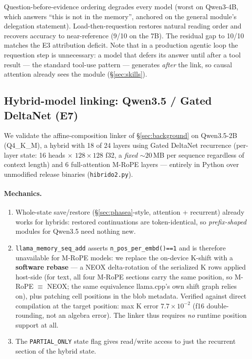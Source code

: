 \documentclass[11pt]{article}
\newcommand{\code}[1]{\texttt{#1}}
\begin{document}
Question-before-evidence ordering degrades every model (worst on Qwen3-4B, which answers ``this is not in the memory'', anchored on the general module's delegation statement). Load-then-requestion restores natural reading order and recovers accuracy to near-reference (9/10 on the 7B). The residual gap to 10/10 matches the E3 attribution deficit. Note that in a production agentic loop the requestion step is unnecessary: a model that defers its answer until after a tool result --- the standard tool-use pattern --- generates \emph{after} the link, so causal attention already sees the module (\S\ref{sec:skills}).

\subsection{Hybrid-model linking: Qwen3.5 / Gated DeltaNet (E7)}
\label{sec:hybrid}

We validate the affine-composition linker of \S\ref{sec:background} on Qwen3.5-2B (Q4\_K\_M), a hybrid with 18 of 24 layers using Gated DeltaNet recurrence (per-layer state: 16 heads $\times$ $128 \times 128$ f32, a \emph{fixed} ${\sim}20$\,MB per sequence regardless of context length) and 6 full-attention M-RoPE layers --- entirely in Python over unmodified release binaries (\code{hibrido2.py}).

\paragraph{Mechanics.}
\begin{enumerate}
  \item Whole-state save/restore (\S\ref{sec:phasea}-style, attention + recurrent) already works for hybrids: restored continuations are token-identical, so \emph{prefix-shaped} modules for Qwen3.5 need nothing new.
  \item \code{llama\_memory\_seq\_add} asserts \code{n\_pos\_per\_embd()==1} and is therefore unavailable for M-RoPE models: we replace the on-device K-shift with a \textbf{software rebase} --- a NEOX delta-rotation of the serialized K rows applied host-side (for text, all four M-RoPE sections carry the same position, so M-RoPE $\equiv$ NEOX; the same equivalence llama.cpp's own shift graph relies on), plus patching cell positions in the blob metadata. Verified against direct compilation at the target position: max K error $7.7 \times 10^{-2}$ (f16 double-rounding, not an algebra error). The linker thus requires \emph{no} runtime position support at all.
  \item The \code{PARTIAL\_ONLY} state flag gives read/write access to just the recurrent section of the hybrid state.
\end{enumerate}
\end{document}
